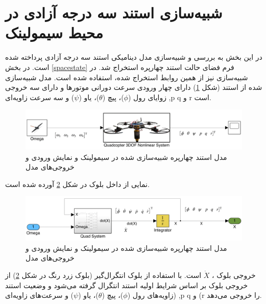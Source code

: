 \section{شبیه‌سازی استند سه درجه آزادی در محیط سیمولینک}\label{quadall3}
در این بخش به بررسی و شبیه‌سازی مدل دینامیکی استند سه درجه آزادی پرداخته شده است. در بخش \ref{spacestate} فرم فضای حالت استند چهارپره استخراج شد. در شبیه‌سازی نیز از همین روابط استخراج شده، استفاده شده است. مدل شبیه‌سازی شده از استند (شکل \ref{quadsimulink}) دارای چهار ورودی سرعت دورانی موتورها  و دارای سه خروجی زوایای رول ($\phi$)، پیچ ($\theta$)، یاو ($\psi$) و  سه سرعت زاویه‌ای
 ,p
q
 و 
r 
 است.
 
 
\begin{figure}[H]
	\includegraphics[width=16cm]{../Figures/QuadSimulation/Stand_Model.png}
	\centering
	\vspace*{-15mm}
	\caption{مدل استند چهارپره شبیه‌سازی شده در سیمولینک و نمایش ورودی و خروجی‌های مدل}
	\label{quadsimulink}
\end{figure}
نمایی از داخل بلوک
در شکل \ref{Quad3DOF} آورده شده است.
\begin{figure}[H]
	\includegraphics[width=16cm]{../Figures/QuadSimulation/Integrator.png}
	\centering
	\vspace*{-15mm}
	\caption{مدل استند چهارپره شبیه‌سازی شده در سیمولینک و نمایش ورودی و خروجی‌های مدل}
	\label{Quad3DOF}
\end{figure}
خروجی بلوک
،
$\dot X$
است. با استفاده از بلوک انتگرال‌گیر (بلوک زرد رنگ در شکل \ref{Quad3DOF})
از خروجی بلوک بر اساس شرایط اولیه استند انتگرال گرفته می‌شود و وضعیت استند (زاویه‌های رول ($\phi$)، پیچ ($\theta$)، یاو ($\psi$) و سرعت‌های زاویه‌ای‌
,p
q
و 
(r
را خروجی می‌دهد.

